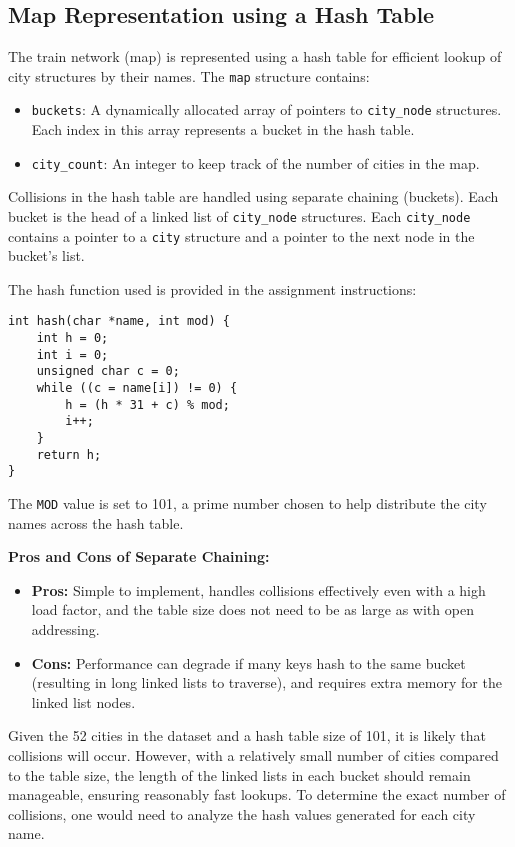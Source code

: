 \documentclass[a4paper,11pt]{article}
\begin{document}
\subsection*{Map Representation using a Hash Table}
The train network (map) is represented using a hash table for efficient lookup of city structures by their names. The \texttt{map} structure contains:

\begin{itemize}
    \item \texttt{buckets}: A dynamically allocated array of pointers to \texttt{city\_node} structures. Each index in this array represents a bucket in the hash table.
    \item \texttt{city\_count}: An integer to keep track of the number of cities in the map.
\end{itemize}

Collisions in the hash table are handled using separate chaining (buckets). Each bucket is the head of a linked list of \texttt{city\_node} structures. Each \texttt{city\_node} contains a pointer to a \texttt{city} structure and a pointer to the next node in the bucket's list.

The hash function used is provided in the assignment instructions:
\begin{verbatim}
int hash(char *name, int mod) {
    int h = 0;
    int i = 0;
    unsigned char c = 0;
    while ((c = name[i]) != 0) {
        h = (h * 31 + c) % mod;
        i++;
    }
    return h;
}
\end{verbatim}
The \texttt{MOD} value is set to 101, a prime number chosen to help distribute the city names across the hash table.

\textbf{Pros and Cons of Separate Chaining:}
\begin{itemize}
    \item \textbf{Pros:} Simple to implement, handles collisions effectively even with a high load factor, and the table size does not need to be as large as with open addressing.
    \item \textbf{Cons:} Performance can degrade if many keys hash to the same bucket (resulting in long linked lists to traverse), and requires extra memory for the linked list nodes.
\end{itemize}

Given the 52 cities in the dataset and a hash table size of 101, it is likely that collisions will occur. However, with a relatively small number of cities compared to the table size, the length of the linked lists in each bucket should remain manageable, ensuring reasonably fast lookups. To determine the exact number of collisions, one would need to analyze the hash values generated for each city name.
\end{document}
